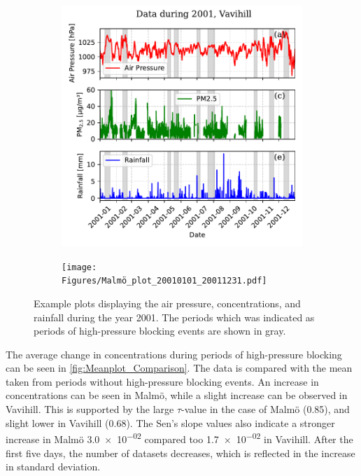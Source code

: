 \begin{figure}[H]
    \centering
    \begin{subfigure}[b]{0.49\textwidth}
        \centering
        \includegraphics[width=\textwidth]{Figures/Vavihill_plot_20010101_20011231.pdf}
        \label{fig:2001Vavihill}
    \end{subfigure}
    \hfill
    \begin{subfigure}[b]{0.49\textwidth}
        \centering
        \texttt{[image: Figures/Malmö\_plot\_20010101\_20011231.pdf]}
        \label{fig:2001Malmö}
    \end{subfigure}
    \caption{Example plots displaying the air pressure, \PM concentrations, and rainfall during the year 2001. The periods which was indicated as periods of high-pressure blocking events are shown in gray. }
    \label{fig:2001}
\end{figure}

The average change in \PM concentrations during periods of high-pressure blocking can be seen in \autoref{fig:Meanplot_Comparison}. The data is compared with the \PM mean taken from periods without high-pressure blocking events. An increase in \PM concentrations can be seen in Malmö, while a slight increase can be observed in Vavihill. This is supported by the large $\tau$-value in the case of Malmö (0.85), and slight lower in Vavihill (0.68). The Sen's slope values also indicate a stronger increase in Malmö \SI{3.0e-02}{} compared too \SI{1.7e-02}{} in Vavihill. After the first five days, the number of datasets decreases, which is reflected in the increase in standard deviation.



